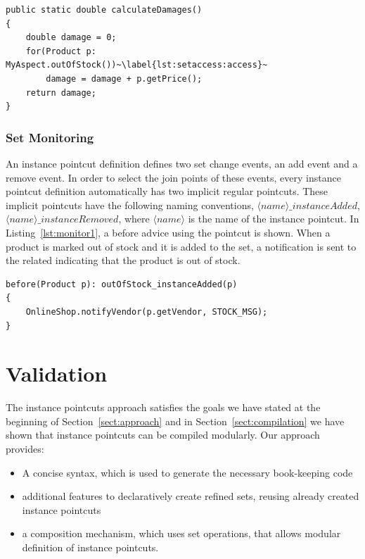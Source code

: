 \begin{lstlisting}[float=h!, caption={Calculate a damage estimate for out of stock products}, label={lst:setaccess}]
public static double calculateDamages()
{
	double damage = 0;
	for(Product p: MyAspect.outOfStock())~\label{lst:setaccess:access}~
		damage = damage + p.getPrice();
	return damage;
}
\end{lstlisting}



\subsubsection{Set Monitoring}
\label{sec:set-monitoring}
An instance pointcut definition defines two set change events, an add event and a remove event. In order to select the join points of these events, every instance pointcut definition automatically has two implicit regular pointcuts. These implicit pointcuts have the following naming conventions, $\langle name \rangle\_instanceAdded$, $\langle name \rangle\_instanceRemoved$, where $\langle name \rangle$ is the name of the instance pointcut. In Listing~\ref{lst:monitor1}, a before advice using the  pointcut is shown.
When a product is marked out of stock and it is added to the set, a notification is sent to the related  indicating that the product is out of stock.

\begin{lstlisting}[float=h!, caption={Set monitoring pointcut used to notify vendors}, label={lst:monitor1}]
before(Product p): outOfStock_instanceAdded(p)
{
	OnlineShop.notifyVendor(p.getVendor, STOCK_MSG);
}
\end{lstlisting}




\section{Validation}
\label{sect:checking}
The instance pointcuts approach satisfies the goals we have stated at the beginning of Section~\ref{sect:approach} and in Section~\ref{sect:compilation} we have shown that instance pointcuts can be compiled modularly.
Our approach provides:

\begin{itemize}
\item A concise syntax, which is used to generate the necessary book-keeping code
\item additional features to declaratively create refined sets, reusing already created instance pointcuts
\item a composition mechanism, which uses set operations, that allows modular definition of instance pointcuts.
\end{itemize}

